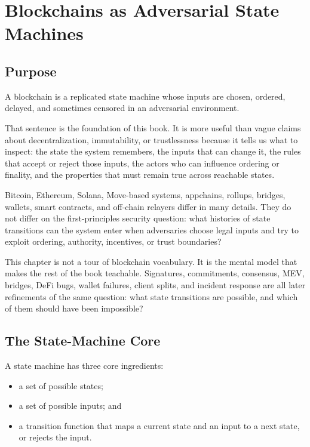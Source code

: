 \chapter{Blockchains as Adversarial State Machines}

\section{Purpose}

\begin{principlebox}
A blockchain is a replicated state machine whose inputs are chosen, ordered, delayed, and sometimes censored in an adversarial environment.
\end{principlebox}

That sentence is the foundation of this book. It is more useful than vague claims about decentralization, immutability, or trustlessness because it tells us what to inspect: the state the system remembers, the inputs that can change it, the rules that accept or reject those inputs, the actors who can influence ordering or finality, and the properties that must remain true across reachable states.

Bitcoin, Ethereum, Solana, Move-based systems, appchains, rollups, bridges, wallets, smart contracts, and off-chain relayers differ in many details. They do not differ on the first-principles security question: what histories of state transitions can the system enter when adversaries choose legal inputs and try to exploit ordering, authority, incentives, or trust boundaries?

This chapter is not a tour of blockchain vocabulary. It is the mental model that makes the rest of the book teachable. Signatures, commitments, consensus, MEV, bridges, DeFi bugs, wallet failures, client splits, and incident response are all later refinements of the same question: what state transitions are possible, and which of them should have been impossible?

\section{The State-Machine Core}

A state machine has three core ingredients:

\begin{itemize}
\item a set of possible states;
\item a set of possible inputs; and
\item a transition function that maps a current state and an input to a next state, or rejects the input.
\end{itemize}

